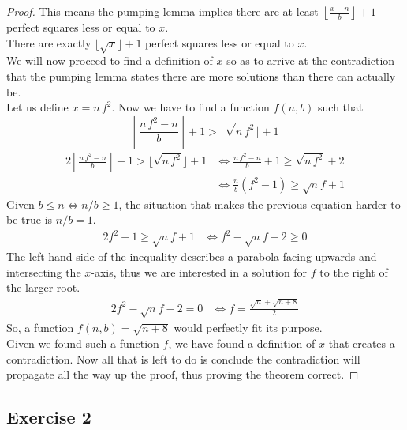 \documentclass[docid=TP07]{tcom_TP}
\begin{document}
{\begin{proof}
This means the pumping lemma implies there are at least $\left\lfloor \frac{x-n}{b} \right\rfloor +1$ perfect squares less or equal to $x$.\\
There are exactly $\lfloor \sqrt{x} \rfloor +1$ perfect squares less or equal to $x$.\\
We will now proceed to find a definition of $x$ so as to arrive at the contradiction that the pumping lemma states there are more solutions than there can actually be.\\
Let us define $x=n\,f^2$. Now we have to find a function $f(n,b)$ such that
\begin{equation*}
	\left\lfloor \frac{n\,f^2-n}{b} \right\rfloor +1 > \lfloor \sqrt{n\,f^2} \rfloor +1
\end{equation*}
\begin{alignat*}{2}
	\left\lfloor \frac{n\,f^2-n}{b} \right\rfloor +1 > \lfloor \sqrt{n\,f^2} \rfloor +1
	&\iff \frac{n\,f^2-n}{b}+1 \geq \sqrt{n\,f^2} +2 \\
	&\iff \frac{n}{b}(f^2-1) \geq \sqrt{n}f + 1
\end{alignat*}
Given $b \leq n \iff n/b \geq 1$, the situation that makes the previous equation harder to be true is $n/b=1$.
\begin{alignat*}{2}
	f^2-1 \geq \sqrt{n}f + 1
	&\iff f^2-\sqrt{n}f-2 \geq 0
\end{alignat*}
The left-hand side of the inequality describes a parabola facing upwards and intersecting the $x$-axis, thus we are interested in a solution for $f$ to the right of the larger root.
 \begin{alignat*}{2}
	f^2-\sqrt{n}f-2 = 0
	&\iff f = \frac{\sqrt{n}+\sqrt{n+8}}{2}
\end{alignat*}
So, a function $f(n,b)=\sqrt{n+8}$ would perfectly fit its purpose.\\
Given we found such a function $f$, we have found a definition of $x$ that creates a contradiction. Now all that is left to do is conclude the contradiction will propagate all the way up the proof, thus proving the theorem correct.
\end{proof}
\subsection{Exercise 2}
}
\end{document}
